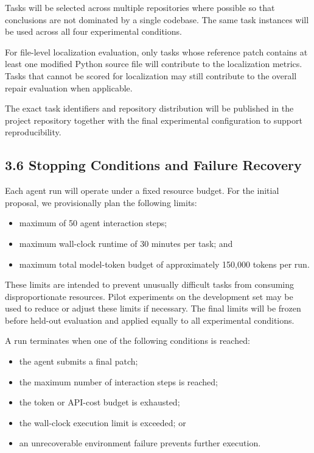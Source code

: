 \documentclass[11pt]{article}
\begin{document}
Tasks will be selected across multiple repositories where possible so
that conclusions are not dominated by a single codebase. The same task
instances will be used across all four experimental conditions.

For file-level localization evaluation, only tasks whose reference patch
contains at least one modified Python source file will contribute to the
localization metrics. Tasks that cannot be scored for localization may
still contribute to the overall repair evaluation when applicable.

The exact task identifiers and repository distribution will be published
in the project repository together with the final experimental
configuration to support reproducibility.


\subsection*{3.6 Stopping Conditions and Failure Recovery}

Each agent run will operate under a fixed resource budget. For the initial
proposal, we provisionally plan the following limits:

\begin{itemize}[leftmargin=*, itemsep=0.25em]
    \item maximum of 50 agent interaction steps;
    \item maximum wall-clock runtime of 30 minutes per task; and
    \item maximum total model-token budget of approximately 150,000 tokens
          per run.
\end{itemize}

These limits are intended to prevent unusually difficult tasks from
consuming disproportionate resources. Pilot experiments on the development
set may be used to reduce or adjust these limits if necessary. The final
limits will be frozen before held-out evaluation and applied equally to
all experimental conditions.

A run terminates when one of the following conditions is reached:

\begin{itemize}[leftmargin=*, itemsep=0.25em]
    \item the agent submits a final patch;
    \item the maximum number of interaction steps is reached;
    \item the token or API-cost budget is exhausted;
    \item the wall-clock execution limit is exceeded; or
    \item an unrecoverable environment failure prevents further execution.
\end{itemize}
\end{document}
